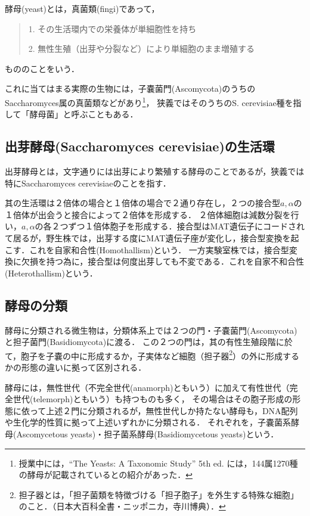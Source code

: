\documentclass[uplatex, dvipdfmx]{jsarticle}
\begin{document}
\begin{screen}\begin{definition*}
\noindent
酵母(yeast)とは，真菌類(fingi)であって，
\begin{quotation}
    1. その生活環内での栄養体が単細胞性を持ち

    2. 無性生殖（出芽や分裂など）により単細胞のまま増殖する
\end{quotation}
\noindent
もののことをいう．
\end{definition*}\end{screen}

これに当てはまる実際の生物には，子嚢菌門(Ascomycota)のうちのSaccharomyces属の真菌類などがあり\footnote{授業中には，“The Yeasts: A Taxonomic Study” 5th ed. には，144属1270種の酵母が記載されているとの紹介があった．}，
狭義ではそのうちのS. cerevisiae種を指して「酵母菌」と呼ぶこともある．

\subsection{出芽酵母(Saccharomyces cerevisiae)の生活環}
出芽酵母とは，文字通りには出芽により繁殖する酵母のことであるが，狭義では特にSaccharomyces cerevisiaeのことを指す．

其の生活環は２倍体の場合と１倍体の場合で２通り存在し，２つの接合型$a,\alpha$の１倍体が出会うと接合によって２倍体を形成する．
２倍体細胞は減数分裂を行い，$a,\alpha$の各２つずつ１倍体胞子を形成する．接合型はMAT遺伝子にコードされて居るが，野生株では，出芽する度にMAT遺伝子座が変化し，接合型変換を起こす．これを自家和合性(Homothallism)という．
一方実験室株では，接合型変換に欠損を持つ為に，接合型は何度出芽しても不変である．これを自家不和合性(Heterothallism)という．\cite{酵母}

\subsection{酵母の分類}

酵母に分類される微生物は，分類体系上では２つの門・子嚢菌門(Ascomycota)と担子菌門(Basidiomycota)に渡る．
この２つの門は，其の有性生殖段階に於て，胞子を子嚢の中に形成するか，子実体など細胞（担子器\footnote{担子器とは，「担子菌類を特徴づける「担子胞子」を外生する特殊な細胞」のこと．（日本大百科全書・ニッポニカ，寺川博典）．}）の外に形成するかの形態の違いに拠って区別される．

酵母には，無性世代（不完全世代(anamorph)ともいう）に加えて有性世代（完全世代(telemorph)ともいう）も持つものも多く，
その場合はその胞子形成の形態に依って上述２門に分類されるが，無性世代しか持たない酵母も，DNA配列や生化学的性質に拠って上述いずれかに分類される．
それぞれを，子嚢菌系酵母(Ascomycetous yeasts)・担子菌系酵母(Basidiomycetous yeasts)という．
\end{document}
